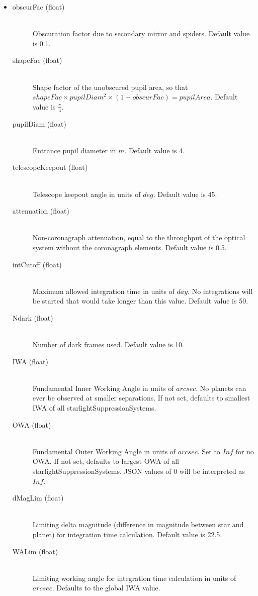 \documentclass[cleanfoot]{asme2ej}
\begin{document}
\begin{itemize}
\item 
\begin{description}
    \item[obscurFac (float)] \hfill \\ Obscuration factor due to secondary mirror and spiders. Default value is 0.1.
    \item[shapeFac (float)] \hfill \\ Shape factor of the unobscured pupil area, so that $ shapeFac \times pupilDiam^2  \times (1-obscurFac) = pupilArea $. Default value is $ \frac{\pi}{4} $.
    \item[pupilDiam (float)] \hfill \\ Entrance pupil diameter in  $ m $. Default value is 4.
    \item[telescopeKeepout (float)] \hfill \\ Telescope keepout angle in units of $ deg $. Default value is 45.
    \item[attenuation (float)] \hfill \\ Non-coronagraph attenuation, equal to the throughput of the optical system without the coronagraph elements. Default value is 0.5.
    \item[intCutoff (float)] \hfill \\ Maximum allowed integration time in units of $ day $. No integrations will be started that would take longer than this value. Default value is 50.
    \item[Ndark (float)] \hfill \\ Number of dark frames used. Default value is 10.
    \item[IWA (float)] \hfill \\ Fundamental Inner Working Angle in units of $ arcsec $. No planets can ever be observed at smaller separations. If not set, defaults to smallest IWA of all starlightSuppressionSystems.
    \item[OWA (float)] \hfill \\ Fundamental Outer Working Angle in units of $ arcsec $. Set to $ Inf $ for no OWA. If not set, defaults to largest OWA of all starlightSuppressionSystems.  JSON values of 0 will be interpreted as $ Inf $.
    \item[dMagLim (float)] \hfill \\ Limiting delta magnitude (difference in magnitude between star and planet) for integration time calculation. Default value is 22.5.
    \item[WALim (float)] \hfill \\ Limiting working angle for integration time calculation in units of $ arcsec $. Defaults to the global IWA value.

\end{description}
\end{itemize}
\end{document}
